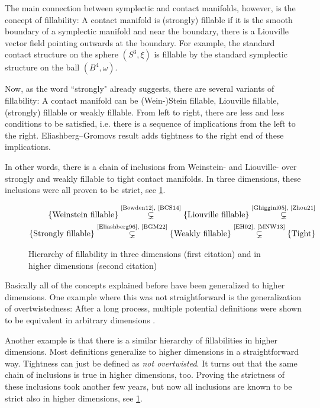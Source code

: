The main connection between symplectic and contact manifolds, however, is the concept of fillability:
A contact manifold is (strongly) fillable if it is the smooth boundary of a symplectic manifold and
near the boundary, there is a Liouville vector field pointing outwards at the boundary.
For example, the standard contact structure on the sphere $(S^3, \xi)$ is fillable
by the standard symplectic structure on the ball $(B^4, \omega)$.

Now, as the word ``strongly" already suggests, there are several variants of fillability:
A contact manifold can be (Wein-)Stein fillable, Liouville fillable, (strongly) fillable or weakly fillable.
From left to right, there are less and less conditions to be satisfied, i.e. there is a sequence
of implications from the left to the right. 
Eliashberg--Gromovs result adds tightness to the right end of these implications.

In other words, there is a chain of inclusions from 
Weinstein- and Liouville- over strongly and weakly fillable to tight contact manifolds.
In three dimensions, these inclusions were all proven to be strict, see \cref{fig:fillability}.
\begin{figure}
    \begin{align*}
        \{\text{Weinstein fillable}\} \stackrel{\text{\cite{Bowden12}, \cite{BCS14}}}{\subsetneq} 
        \{\text{Liouville fillable}\} \stackrel{\text{\cite{Ghiggini05}, \cite{Zhou21}}}{\subsetneq}\\
        \{\text{Strongly  fillable}\} \stackrel{\text{\cite{Eliashberg96}, \cite{BGM22}}}{\subsetneq}
        \{\text{Weakly    fillable}\} \stackrel{\text{\cite{EH02}, \cite{MNW13}}}{\subsetneq}
        \{\text{Tight}\}
    \end{align*}
    \caption{Hierarchy of fillability in three dimensions (first citation) and in higher dimensions (second citation)}
    \label{fig:fillability}
\end{figure}

Basically all of the concepts explained before have been generalized to higher dimensions.
One example where this was not straightforward is the generalization of overtwistedness: 
After a long process, multiple potential definitions were shown to be equivalent in arbitrary dimensions \cite{BEM15,CMP19,Huang17}.

Another example is that there is a similar hierarchy of fillabilities in higher dimensions. 
Most definitions generalize to higher dimensions in a straightforward way. Tightness can just be defined as \textit{not overtwisted}.
It turns out that the same chain of inclusions is true in higher dimensions, too.
Proving the strictness of these inclusions took another few years, but now all inclusions are known to be strict also in higher dimensions, 
see \cref{fig:fillability}.

